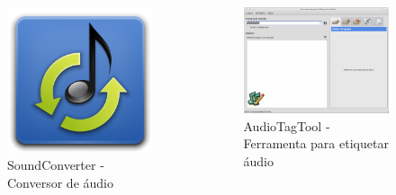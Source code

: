 \begin{frame}
\begin{columns}
\begin{column}{4cm}
		\begin{figure}
			\includegraphics[scale=0.7]{img/soundconverter.png}
			\caption{SoundConverter - Conversor de áudio}
		\end{figure}
	\end{column}

	\begin{column}{4cm}
		\begin{figure}
			\includegraphics[scale=0.2]{img/audiotagtool.png} 
			\caption{AudioTagTool - Ferramenta para etiquetar áudio}
		\end{figure}
	\end{column}
	
\end{columns}

\end{frame}

